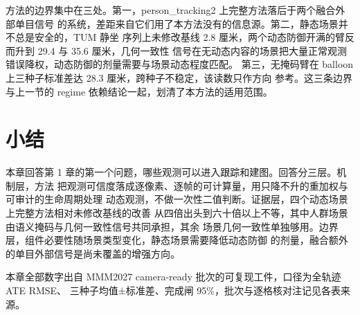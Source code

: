 方法的边界集中在三处。第一，person\_tracking2 上完整方法落后于两个融合外部单目信号
的系统，差距来自它们用了本方法没有的信息源。第二，静态场景并不总是安全的，TUM 静坐
序列上未修改基线 2.8 厘米，两个动态防御开满的臂反而升到 29.4 与 35.6 厘米，几何一致性
信号在无动态内容的场景把大量正常观测错误降权，动态防御的剂量需要与场景动态程度匹配。
第三，无掩码臂在 balloon 上三种子标准差达 28.3 厘米，跨种子不稳定，该读数只作方向
参考。这三条边界与上一节的 regime 依赖结论一起，划清了本方法的适用范围。

\section{小结}
\label{sec:study1-summary}

本章回答第 1 章的第一个问题，哪些观测可以进入跟踪和建图。回答分三层。机制层，方法
把观测可信度落成逐像素、逐帧的可计算量，用只降不升的重加权与可审计的生命周期处理
动态观测，不做一次性二值判断。证据层，四个动态场景上完整方法相对未修改基线的改善
从四倍出头到六十倍以上不等，其中人群场景由语义掩码与几何一致性信号共同承担，其余
场景几何一致性单独够用。边界层，组件必要性随场景类型变化，静态场景需要降低动态防御
的剂量，融合额外的单目外部信号是尚未覆盖的增强方向。

本章全部数字出自 MMM2027 camera-ready 批次的可复现工件，口径为全轨迹 ATE RMSE、
三种子均值±标准差、完成闸 95\%，批次与逐格核对注记见各表来源。

